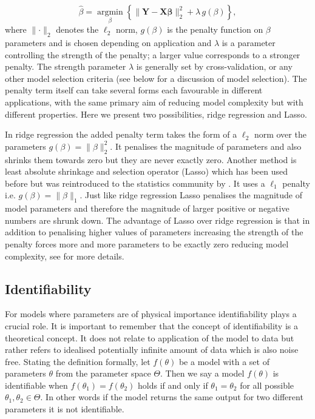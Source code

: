 \begin{equation}
  \label{eq:pen-log-lik}
  \hat{\beta} = \underset{\beta}{\operatorname{argmin}}  \left\lbrace \lVert \mathbf{Y} - \mathbf{X}\mathbf{\beta}\lVert^2_2 + \lambda\, g(\beta) \right\rbrace,
\end{equation}
where $\lVert  \cdot \rVert_2$ denotes the $\ell_2$ norm, $g(\beta)$ is the penalty function on $\beta$ parameters and is chosen depending on application and $\lambda$ is a parameter controlling the strength of the penalty; a larger value corresponds to a stronger penalty. The strength parameter $\lambda$ is generally set by cross-validation, or any other model selection criteria (see below for a discussion of model selection). The penalty term itself can take several forms each favourable in different applications, with the same primary aim of reducing model complexity but with different properties. Here we present two possibilities, ridge regression and Lasso.

In ridge regression the added penalty term takes the form of a $\ell_2$ norm over the parameters $g(\beta) = \lVert \beta \rVert_2^2$. It penalises the magnitude of parameters and also shrinks them towards zero but they are never exactly zero. Another method is least absolute shrinkage and selection operator (Lasso) which has been used before but was reintroduced to the statistics community by \cite{Tibshirani:1996wba}. It uses a $\ell_1$ penalty i.e. $g(\beta) = \lVert \beta \rVert_1$. Just like ridge regression Lasso penalises the magnitude of model parameters and therefore the magnitude of larger positive or negative numbers are shrunk down. The advantage of Lasso over ridge regression is that in addition to penalising higher values of parameters increasing the strength of the penalty forces more and more parameters to be exactly zero reducing model complexity, see \cite{hastie2001elements} for more details.

\subsection{Identifiability}
\label{sec:identifiability-back}

For models where parameters are of physical importance identifiability plays a crucial role. It is important to remember that the concept of identifiability is a theoretical concept. It does not relate to application of the model to data but rather refers to idealised potentially infinite amount of data which is also noise free. Stating the definition formally, let $f(\theta)$ be a model with a set of parameters $\theta$ from the parameter space $\Theta$. Then we say a model $f(\theta)$ is identifiable when $f(\theta_1) = f(\theta_2)$ holds if and only if $\theta_1 = \theta_2$ for all possible $\theta_1, \theta_2 \in \Theta$. In other words if the model returns the same output for two different parameters it is not identifiable.

